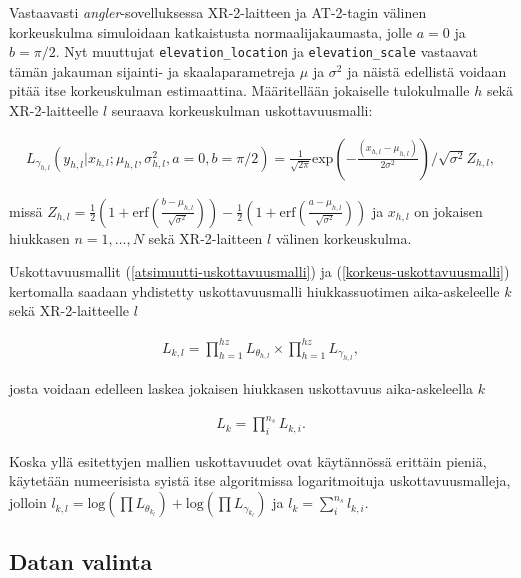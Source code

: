 \documentclass[
  12pt,
  a4paper, twoside]{book}
\begin{document}
Vastaavasti \emph{angler}-sovelluksessa XR-2-laitteen ja AT-2-tagin välinen korkeuskulma simuloidaan katkaistusta normaalijakaumasta, jolle \(a=0\) ja \(b=\pi/2\). Nyt muuttujat \texttt{elevation\_location} ja \texttt{elevation\_scale} vastaavat tämän jakauman sijainti- ja skaalaparametreja \(\mu\) ja \(\sigma^2\) ja näistä edellistä voidaan pitää itse korkeuskulman estimaattina. Määritellään jokaiselle tulokulmalle \(h\) sekä XR-2-laitteelle \(l\) seuraava korkeuskulman uskottavuusmalli:

\begin{align}\label{korkeus-uskottavuusmalli}
L_{\gamma_{h,l}}(y_{h,l}|x_{h,l}; \mu_{h,l}, \sigma^2_{h,l}, a=0, b=\pi/2)=\frac{1}{\sqrt{2 \pi}} \text{exp}\left(-\frac{(x_{h,l}-\mu_{h,l})}{2 \sigma^2}\right) / \sqrt{\sigma^2}Z_{h,l},
\end{align}

\noindent missä \(Z_{h,l}=\frac{1}{2}(1+\text{erf}(\frac{b-\mu_{h,l}}{\sqrt{\sigma^2}}))-\frac{1}{2}(1+\text{erf}(\frac{a-\mu_{h,l}}{\sqrt{\sigma^2}}))\) ja \(x_{h,l}\) on jokaisen hiukkasen \(n=1,\ldots,N\) sekä XR-2-laitteen \(l\) välinen korkeuskulma.

Uskottavuusmallit (\ref{atsimuutti-uskottavuusmalli}) ja (\ref{korkeus-uskottavuusmalli}) kertomalla saadaan yhdistetty uskottavuusmalli hiukkassuotimen aika-askeleelle \(k\) sekä XR-2-laitteelle \(l\)

\begin{align}\label{yhdistetty-uskottavuusmalli}
L_{k,l}=\prod_{h=1}^{hz} L_{\theta_{h,l}} \times \prod_{h=1}^{hz} L_{\gamma_{h,l}},
\end{align}

\noindent josta voidaan edelleen laskea jokaisen hiukkasen uskottavuus aika-askeleella \(k\)

\begin{align}\label{lopullinen-uskottavuusmalli}
L_{k}=\prod_i^{n_s} L_{{k,i}}.
\end{align}

Koska yllä esitettyjen mallien uskottavuudet ovat käytännössä erittäin pieniä, käytetään numeerisista syistä itse algoritmissa logaritmoituja uskottavuusmalleja, jolloin \(l_{k,l} = \text{log}(\prod L_{\theta_{k_l}}) + \text{log}(\prod L_{\gamma_{k_l}})\) ja \(l_k = \sum_i^{n_s} l_{k,i}\).

\hypertarget{datan-valinta}{%
\subsection{Datan valinta}\label{datan-valinta}}
\end{document}

